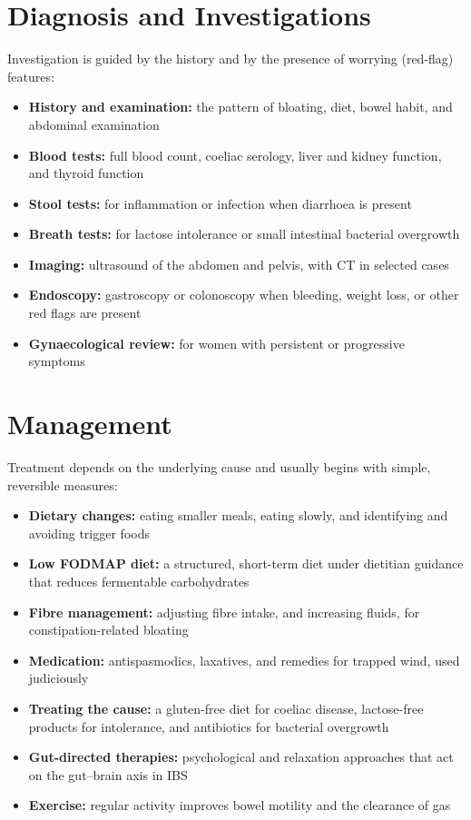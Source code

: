 \section*{Diagnosis and Investigations}
Investigation is guided by the history and by the presence of worrying (red-flag) features:

\begin{itemize}
    \item \textbf{History and examination:} the pattern of bloating, diet, bowel habit, and abdominal examination
    \item \textbf{Blood tests:} full blood count, coeliac serology, liver and kidney function, and thyroid function
    \item \textbf{Stool tests:} for inflammation or infection when diarrhoea is present
    \item \textbf{Breath tests:} for lactose intolerance or small intestinal bacterial overgrowth
    \item \textbf{Imaging:} ultrasound of the abdomen and pelvis, with CT in selected cases
    \item \textbf{Endoscopy:} gastroscopy or colonoscopy when bleeding, weight loss, or other red flags are present
    \item \textbf{Gynaecological review:} for women with persistent or progressive symptoms
\end{itemize}

\section*{Management}
Treatment depends on the underlying cause and usually begins with simple, reversible measures:

\begin{itemize}
    \item \textbf{Dietary changes:} eating smaller meals, eating slowly, and identifying and avoiding trigger foods
    \item \textbf{Low FODMAP diet:} a structured, short-term diet under dietitian guidance that reduces fermentable carbohydrates
    \item \textbf{Fibre management:} adjusting fibre intake, and increasing fluids, for constipation-related bloating
    \item \textbf{Medication:} antispasmodics, laxatives, and remedies for trapped wind, used judiciously
    \item \textbf{Treating the cause:} a gluten-free diet for coeliac disease, lactose-free products for intolerance, and antibiotics for bacterial overgrowth
    \item \textbf{Gut-directed therapies:} psychological and relaxation approaches that act on the gut--brain axis in IBS
    \item \textbf{Exercise:} regular activity improves bowel motility and the clearance of gas
\end{itemize}

